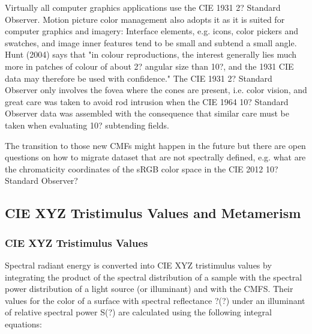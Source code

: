 Virtually all computer graphics applications use the CIE 1931 2? Standard Observer. Motion picture color management also adopts it as it is suited for computer graphics and imagery:
Interface elements, e.g. icons, color pickers and swatches, and image inner features tend to be small and subtend a small angle. Hunt (2004) says that "in colour reproductions, the interest generally lies much more in patches of colour of about 2? angular size than 10?, and the 1931 CIE data may therefore be used with confidence."
The CIE 1931 2? Standard Observer only involves the fovea where the cones are present, i.e. color vision, and great care was taken to avoid rod intrusion when the CIE 1964 10? Standard Observer data was assembled with the consequence that similar care must be taken when evaluating 10? subtending fields.

The transition to those new CMFs might happen in the future but there are open questions on how to migrate dataset that are not spectrally defined, e.g. what are the chromaticity coordinates of the sRGB color space in the CIE 2012 10? Standard Observer?

\subsection{CIE XYZ Tristimulus Values and Metamerism}%
\label{subsec:cie-xyz-tristimulus-values-and-metamerism}

\subsubsection{CIE XYZ Tristimulus Values}%
\label{subsubsec:cie-xyz-tristimulus-values}

Spectral radiant energy is converted into CIE XYZ tristimulus values by integrating the product of the spectral distribution of a sample with the spectral power distribution of a light source (or illuminant) and with the CMFS. Their values for the color of a surface with spectral reflectance ?(?) under an illuminant of relative spectral power S(?) are calculated using the following integral equations:


